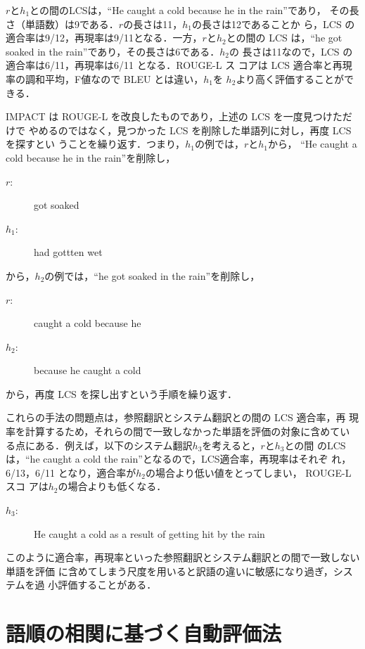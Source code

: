 \documentclass[japanese]{jnlp_1.4}
\begin{document}
$r$と$h_1$との間のLCSは，``He caught a cold because he in the rain''であり，
その長さ（単語数）は9である．$r$の長さは11，$h_1$の長さは12であることか
ら，LCS の適合率は9/12，再現率は9/11となる．一方，$r$と$h_2$との間の
LCS は，``he got soaked in the rain''であり，その長さは6である．$h_2$の
長さは11なので，LCS の適合率は6/11，再現率は6/11 となる．ROUGE-L ス
コアは LCS 適合率と再現率の調和平均，F値なので BLEU とは違い，$h_1$を
$h_2$より高く評価することができる．

IMPACT は ROUGE-L を改良したものであり，上述の LCS を一度見つけただけで
やめるのではなく，見つかった LCS を削除した単語列に対し，再度 LCS を探すとい
うことを繰り返す．つまり，$h_1$の例では，$r$と$h_1$から，
``He caught a cold because he in the rain''を削除し，
\begin{description}
 \item[{\mdseries $r$:}] got soaked
 \item[{\mdseries $h_1$:}] had gottten wet 
\end{description}
から，$h_2$の例では，``he got soaked in the rain''を削除し，
\begin{description}
 \item[{\mdseries $r$:}] caught a cold because he
 \item[{\mdseries $h_2$:}] because he caught a cold
\end{description}
から，再度 LCS を探し出すという手順を繰り返す．

これらの手法の問題点は，参照翻訳とシステム翻訳との間の LCS 適合率，再
現率を計算するため，それらの間で一致しなかった単語を評価の対象に含めてい
る点にある．例えば，以下のシステム翻訳$h_3$を考えると，$r$と$h_3$との間
のLCSは，``he caught a cold the rain''となるので，LCS適合率，再現率はそれぞ
れ，6/13，6/11 となり，適合率が$h_2$の場合より低い値をとってしまい， ROUGE-Lスコ
アは$h_2$の場合よりも低くなる．

\begin{description}
 \item[{\mdseries $h_3$:}] He caught a cold as a result of getting hit by the rain
\end{description}

このように適合率，再現率といった参照翻訳とシステム翻訳との間で一致しない単語を評価
に含めてしまう尺度を用いると訳語の違いに敏感になり過ぎ，システムを過
小評価することがある．


\section{語順の相関に基づく自動評価法}
\end{document}
